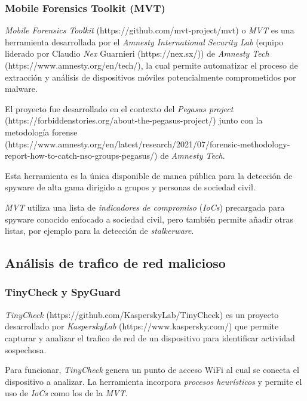 \documentclass[12pt]{caltech_thesis}
\begin{document}
\subsubsection{Mobile Forensics Toolkit (MVT)}

\textit{Mobile Forensics Toolkit} (https://github.com/mvt-project/mvt) o \textit{MVT} es una herramienta desarrollada por el \textit{Amnesty International Security Lab} (equipo liderado por Claudio \textit{Nex} Guarnieri (https://nex.sx/)) de \textit{Amnesty Tech} (https://www.amnesty.org/en/tech/), la cual permite automatizar el proceso de extracción y análisis de dispositivos móviles potencialmente comprometidos por malware.

El proyecto fue desarrollado en el contexto del \textit{Pegasus project} (https://forbiddenstories.org/about-the-pegasus-project/) junto con la metodología forense (https://www.amnesty.org/en/latest/research/2021/07/forensic-methodology-report-how-to-catch-nso-groups-pegasus/) de \textit{Amnesty Tech}.

Esta herramienta es la única disponible de manea pública para la detección de spyware de alta gama dirigido a grupos y personas de sociedad civil.

\textit{MVT} utiliza una lista de \textit{indicadores de compromiso} (\textit{IoCs}) precargada para spyware conocido enfocado a sociedad civil, pero también permite añadir otras listas, por ejemplo para la detección de \textit{stalkerware}.

\subsection{Análisis de trafico de red malicioso}

\subsubsection{TinyCheck y SpyGuard}

\textit{TinyCheck} (https://github.com/KasperskyLab/TinyCheck) es un proyecto desarrollado por \textit{KasperskyLab} (https://www.kaspersky.com/) que permite capturar y analizar el trafico de red de un dispositivo para identificar actividad sospechosa.

Para funcionar, \textit{TinyCheck} genera un punto de acceso WiFi al cual se conecta el dispositivo a analizar. La herramienta incorpora \textit{procesos heurísticos} y permite el uso de \textit{IoCs} como los de la \textit{MVT}.
\end{document}
